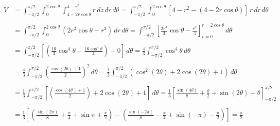 \documentclass{article}
\begin{document}
\begin{align*}
V&=\int_{-\pi/2}^{\pi/2}\int_{0}^{2\cos\theta}\int_{4-2r\cos\theta}^{4-r^2}r\,dz\,dr\,d\theta=\int_{-\pi/2}^{\pi/2}\int_{0}^{2\cos\theta}\left[4-r^2-\left(4-2r\cos\theta\right)\right]\,r\,dr\,d\theta\\\\&=\int_{-\pi/2}^{\pi/2}\int_0^{2\cos\theta}(2r^2\cos\theta-r^3)\,dr\,d\theta=\int_{-\pi/2}^{\pi/2}\left[\frac{2r^3}3\cos\theta-\frac{r^4}4\right]_{r=0}^{r=2\cos\theta}\,d\theta\\\\&=\int_{-\pi/2}^{\pi/2}\left[\left(\frac{16}3\cos^4\theta-\frac{16\cos^4\theta}4\right) - 0\right]\,d\theta=\frac43\int_{-\pi/2}^{\pi/2}\cos^4\theta\,d\theta\\\\&=\frac43\int_{-\pi/2}^{\pi/2}\left(\frac{\cos(2\theta)+1}2\right)^2\,d\theta=\frac13\int_{-\pi/2}^{\pi/2}\left(\cos^2(2\theta)+2\cos(2\theta)+1\right)\,d\theta\\\\&=\frac13\int_{-\pi/2}^{\pi/2}\left[\left(\frac{\cos(4\theta)+1}2\right)+2\cos(2\theta)+1\right]\,d\theta=\frac13\left[\frac{\sin(4\theta)}8+\frac\theta2+\sin(2\theta)+\theta\right]_{-\pi/2}^{\pi/2}\\\\&=\frac13\left[\left(\frac{\sin(2\pi)}8+\frac\pi4+\sin\pi+\frac\pi2\right)-\left(\frac{\sin\left(-2\pi\right)}8-\frac\pi4+\sin(-\pi)-\frac\pi2\right)\right]=\boxed{\frac\pi2}
\end{align*}
\end{document}
